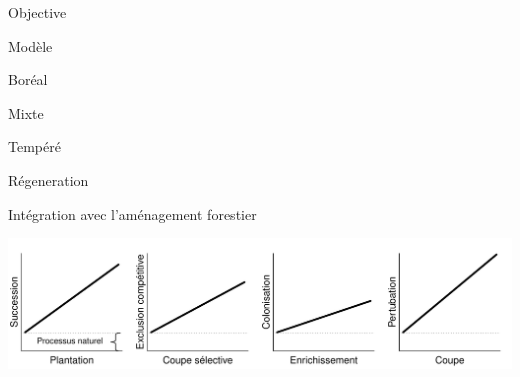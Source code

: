 \documentclass[11pt, compress, aspectratio=1610]{beamer}
\providecommand{\tightlist}{%
  \setlength{\itemsep}{0pt}\setlength{\parskip}{0pt}}
\begin{document}
\begin{frame}{Objective}
\begin{center}
\end{center}

\end{frame}

\begin{frame}{Modèle}

\centering
 \par

\begin{description}
\tightlist
\item[B]
Boréal
\item[M]
Mixte
\item[T]
Tempéré
\item[R]
Régeneration
\end{description}

\end{frame}

\begin{frame}{Intégration avec l'aménagement forestier}

\centering
 \includegraphics[scale=0.65]{figures/managMechanism.pdf}\par

\end{frame}
\end{document}

